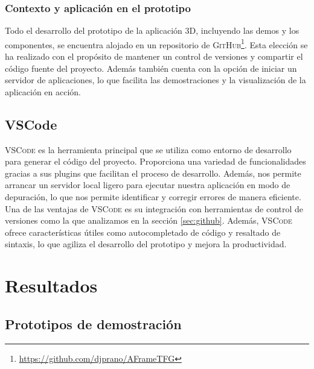 \documentclass[a4paper, 11pt]{book}
\begin{document}
\subsection{Contexto y aplicación en el prototipo}
Todo el desarrollo del prototipo de la aplicación \textsc{3D}, incluyendo las demos y los componentes, se encuentra alojado en un repositorio de \textsc{GitHub}\footnote{\url{https://github.com/djprano/AFrameTFG}}. Esta elección se ha realizado con el propósito de mantener un control de versiones y compartir el código fuente del proyecto.
Además también cuenta con la opción de iniciar un servidor de aplicaciones, lo que facilita las demostraciones y la visualización de la aplicación en acción.

\section{VSCode}
\textsc{VSCode} es la herramienta principal que se utiliza como entorno de desarrollo para generar el código del proyecto. Proporciona una variedad de funcionalidades gracias a sus plugins que facilitan el proceso de desarrollo. 
Además, nos permite arrancar un servidor local ligero para ejecutar nuestra aplicación en modo de depuración, lo que nos permite identificar y corregir errores de manera eficiente.
Una de las ventajas de \textsc{VSCode} es su integración con herramientas de control de versiones como la que analizamos en la sección \ref{sec:github}. Además, \textsc{VSCode} ofrece características útiles como autocompletado de código y resaltado de sintaxis, lo que agiliza el desarrollo del prototipo y mejora la productividad.




\clearpage

\chapter{Resultados}
\label{chap:resultados}
\section{Prototipos de demostración}
\end{document}
